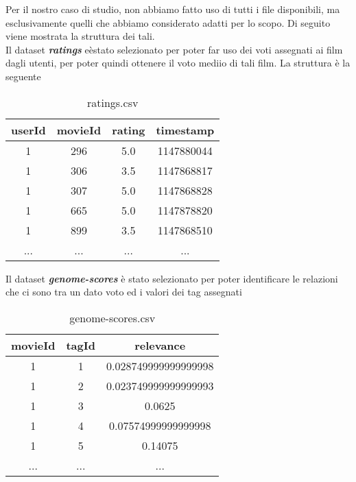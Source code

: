 \documentclass[../../Report.tex]{subfiles}
\begin{document}
Per il nostro caso di studio, non abbiamo fatto uso di tutti i file disponibili, ma esclusivamente quelli che abbiamo considerato adatti per lo scopo.
Di seguito viene mostrata la struttura dei tali.
\\
Il dataset \textit{\textbf{ratings}} eèstato selezionato per poter far uso dei voti assegnati ai film dagli utenti, per poter quindi ottenere il voto mediio di tali film.
La struttura è la seguente
\begin{table}[H]
    \centering
    \begin{tabular}{|c|c|c|c|}
        \hline
        \textbf{userId} & \textbf{movieId} & \textbf{rating} & \textbf{timestamp} \\
        \hline
        1               & 296              & 5.0             & 1147880044         \\
        1               & 306              & 3.5             & 1147868817         \\
        1               & 307              & 5.0             & 1147868828         \\
        1               & 665              & 5.0             & 1147878820         \\
        1               & 899              & 3.5             & 1147868510         \\
        ...             & ...              & ...             & ...                \\
        \hline
    \end{tabular}
    \caption{ratings.csv}
    \label{tab:ratings_csv}
\end{table}

Il dataset \textit{\textbf{genome-scores}} è stato selezionato per poter identificare le relazioni che ci sono tra un dato voto ed i valori dei tag assegnati
\begin{table}[H]
    \centering
    \begin{tabular}{|c|c|c|}
        \hline
        \textbf{movieId} & \textbf{tagId} & \textbf{relevance}   \\
        \hline
        1                & 1              & 0.028749999999999998 \\
        1                & 2              & 0.023749999999999993 \\
        1                & 3              & 0.0625               \\
        1                & 4              & 0.07574999999999998  \\
        1                & 5              & 0.14075              \\
        ...              & ...            & ...                  \\
        \hline
    \end{tabular}
    \caption{genome-scores.csv}
    \label{tab:genome-scores_csv}
\end{table}
\end{document}
